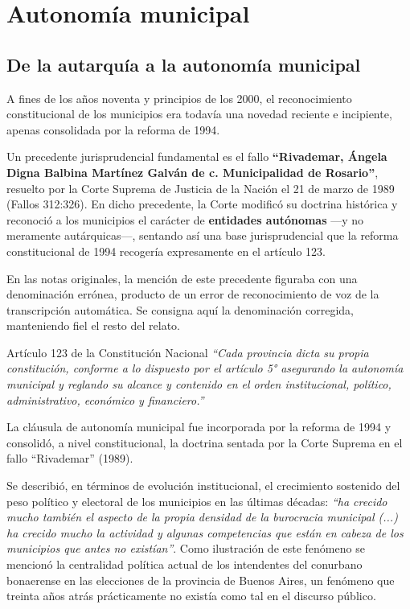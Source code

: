 \documentclass[12pt,oneside]{book}
\begin{document}
\chapter[Autonomía municipal]{Autonomía municipal}

\section{De la autarquía a la autonomía municipal}

A fines de los años noventa y principios de los 2000, el reconocimiento constitucional de los municipios era todavía una novedad reciente e incipiente, apenas consolidada por la reforma de 1994.

Un precedente jurisprudencial fundamental es el fallo \textbf{``Rivademar, Ángela Digna Balbina Martínez Galván de c. Municipalidad de Rosario''}, resuelto por la Corte Suprema de Justicia de la Nación el 21 de marzo de 1989 (Fallos 312:326). En dicho precedente, la Corte modificó su doctrina histórica y reconoció a los municipios el carácter de \textbf{entidades autónomas} ---y no meramente autárquicas---, sentando así una base jurisprudencial que la reforma constitucional de 1994 recogería expresamente en el artículo 123.

\begin{note}
En las notas originales, la mención de este precedente figuraba con una denominación errónea, producto de un error de reconocimiento de voz de la transcripción automática. Se consigna aquí la denominación corregida, manteniendo fiel el resto del relato.
\end{note}

\begin{norma}{Artículo 123 de la Constitución Nacional}
\textit{``Cada provincia dicta su propia constitución, conforme a lo dispuesto por el artículo 5° asegurando la autonomía municipal y reglando su alcance y contenido en el orden institucional, político, administrativo, económico y financiero.''}

\medskip
La cláusula de autonomía municipal fue incorporada por la reforma de 1994 y consolidó, a nivel constitucional, la doctrina sentada por la Corte Suprema en el fallo ``Rivademar'' (1989).
\end{norma}

Se describió, en términos de evolución institucional, el crecimiento sostenido del peso político y electoral de los municipios en las últimas décadas: \textit{``ha crecido mucho también el aspecto de la propia densidad de la burocracia municipal (...) ha crecido mucho la actividad y algunas competencias que están en cabeza de los municipios que antes no existían''}. Como ilustración de este fenómeno se mencionó la centralidad política actual de los intendentes del conurbano bonaerense en las elecciones de la provincia de Buenos Aires, un fenómeno que treinta años atrás prácticamente no existía como tal en el discurso público.
\end{document}
